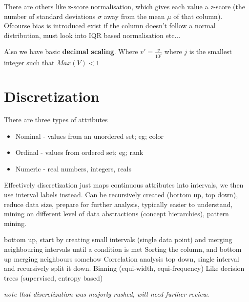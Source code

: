 \documentclass{article}
\begin{document}
There are others like z-score normalisation, which gives each value a z-score (the number of standard deviations $\sigma$ away from the mean $\mu$ of that column). Ofcourse bias is introduced exist if the column doesn't follow a normal distribution, must look into IQR based normalisation etc...

Also we have basic {\bf decimal scaling}. Where $v\prime = \frac{v}{10^j}$ where $j$ is the smallest integer such that $Max(V) < 1$

\section{Discretization}
There are three types of attributes
\begin{itemize}
	\item Nominal - values from an unordered set; eg; color
	\item Ordinal - values from ordered set; eg; rank
	\item Numeric - real numbers, integers, reals
\end{itemize}

Effectively discretization just maps continuous attributes into intervals, we then use interval labels instead. Can be recursively created (bottom up, top down), reduce data size, prepare for further analysis, typically easier to understand, mining on different level of data abstractions (concept hierarchies), pattern mining.

\begin{outline}
	\1 bottom up, start by creating small intervals (single data point) and merging neighbouring intervals until a condition is met
		\2 Sorting the column, and bottom up merging neighbours somehow
		\2 Correlation analysis
	\1 top down, single interval and recursively split it down.
		\2 Binning (equi-width, equi-frequency)
		\2 Like decision trees (supervised, entropy based)

{\em note that discretization was majorly rushed, will need further review}.

\end{outline}
\end{document}
